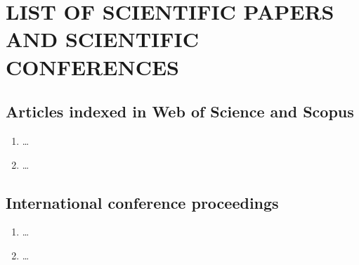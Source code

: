 \section*{\MakeUppercase{List of scientific papers and scientific conferences}} \label{publications}
\subsection*{Articles indexed in Web of Science and Scopus}
    \begin{enumerate}
	\item \dots
	\item \dots
\end{enumerate}
\subsection*{International conference proceedings}
\begin{enumerate}
	\item \dots
	\item \dots
\end{enumerate}
